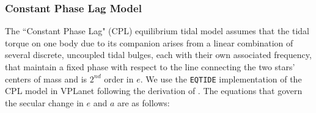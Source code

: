 \documentclass[twocolumn]{aastex61}
\newcommand{\eqtide}[0]{\texttt{EQTIDE}\xspace}
\begin{document}
\subsubsection{Constant Phase Lag Model}

The ``Constant Phase Lag" (CPL) \citep[][]{FerrazMello2008,Heller2011} equilibrium tidal model assumes that the tidal torque on one body due to its companion arises from a linear combination of several discrete, uncoupled tidal bulges, each with their own associated frequency, that maintain a fixed phase with respect to the line connecting the two stars' centers of mass and is $2^{nd}$ order in $e$. We use the \eqtide implementation of the CPL model in VPLanet following the derivation of \citet{FerrazMello2008}.  The equations that govern the secular change in $e$ and $a$ are as follows:
\end{document}

